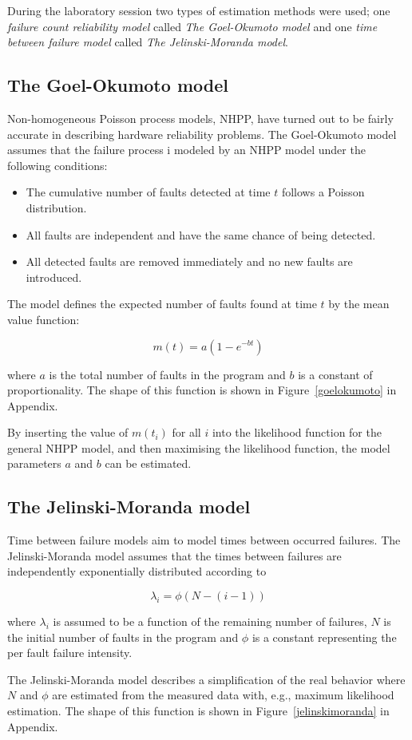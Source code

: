 During the laboratory session two types of estimation methods were used; one \textit{failure count reliability model} called \textit{The Goel-Okumoto model }and one \textit{time between failure model} called \textit{The Jelinski-Moranda model}. 

\subsection{The Goel-Okumoto model}
Non-homogeneous Poisson process models, NHPP, have turned out to be fairly accurate in describing hardware reliability problems. The Goel-Okumoto model assumes that the failure process i modeled by an NHPP model under the following conditions:
\begin{itemize}
\item	The cumulative number of faults detected at time $t$ follows a Poisson distribution.
\item	All faults are independent and have the same chance of being detected.
\item 	All detected faults are removed immediately and no new faults are introduced.
\end{itemize}

\noindent The model defines the expected number of faults found at time $t$ by the mean value function:

$$m(t) = a(1 - e^{-bt})$$

\noindent where $a$ is the total number of faults in the program and $b$ is a constant of proportionality. The shape of this function is shown in Figure~\ref{goelokumoto} in Appendix. 

By inserting the value of $m(t_{i})$ for all $i$ into the likelihood function for the general NHPP model, and then maximising the likelihood function, the model parameters $a$ and $b$ can be estimated. 

\subsection{The Jelinski-Moranda model}
Time between failure models aim to model times between occurred failures. The Jelinski-Moranda model assumes that the times between failures are independently exponentially distributed according to 

$$\lambda_{i}=\phi(N-(i-1))$$

\noindent where $\lambda_{i}$ is assumed to be a function of the remaining number of failures, $N$ is the initial number of faults in the program and $\phi$ is a constant representing the per fault failure intensity.

The Jelinski-Moranda model describes a simplification of the real behavior where $N$ and $\phi$ are estimated from the measured data with, e.g., maximum likelihood estimation. The shape of this function is shown in Figure~\ref{jelinskimoranda} in Appendix. 